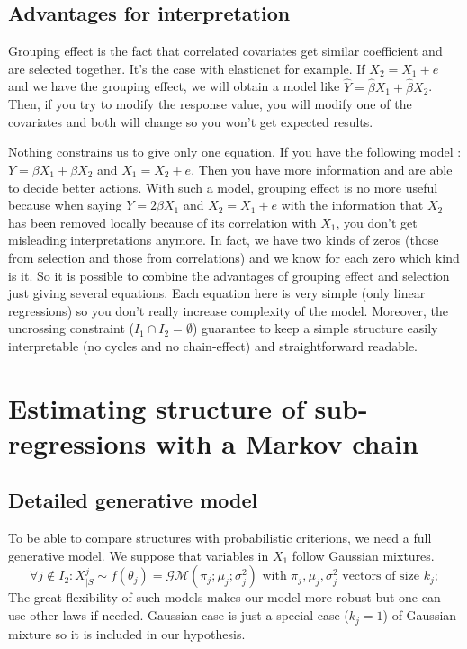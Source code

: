 \documentclass[11pt,a4paper]{article}
\begin{document}
	\subsection{Advantages for interpretation}
	
		Grouping effect is the fact that correlated covariates get similar coefficient and are selected together. It's the case with elasticnet \cite{zou2005regularization} for example.	
			If $X_2=X_1+e$ and we have the grouping effect, we will obtain a model like $\hat{Y}=\hat{\beta}X_1+\hat{\beta}X_2$. 
			Then, if you try to modify the response value, you will modify one of the covariates and both will change so you won't get expected results. 
			
		
		
			Nothing constrains us to give only one equation. %
			If you have the following model : $Y=\beta X_1+\beta X_2$ and $X_1=X_2+e$. Then you have more information and are able to decide better actions. 
			With such a model, grouping effect is no more useful because when saying $Y=2\beta X_1$ and $X_2=X_1+e$ with the information that $X_2$ has been removed locally because of its correlation with $X_1$, you don't get misleading interpretations anymore. In fact, we have two kinds of zeros (those from selection and those from correlations) and we know for each zero which kind is it.
			So it is possible to combine the advantages of grouping effect and selection just giving several equations. 
			Each equation here is very simple (only linear regressions) so you don't really increase complexity of the model. 
			Moreover, the uncrossing constraint ($I_1\cap I_2=\emptyset$) guarantee to keep a simple structure easily interpretable (no cycles and no chain-effect) and straightforward readable.

	
	\section{Estimating structure of sub-regressions with a Markov chain}	
\subsection{Detailed generative model}
	To be able to compare structures with probabilistic criterions, we need a full generative model. We suppose that variables in $X_1$ follow Gaussian mixtures. 
	\begin{equation}
			\forall j \notin I_2 : X^j_{|S} \sim f(\theta_j)=\mathcal{GM}(\pi_j;\mu_j;\sigma^2_j) \textrm{ with } \pi_j,\mu_j,\sigma^2_j \textrm{ vectors of size } k_j; \label{mixtureX1}
		\end{equation}
		The great flexibility \cite{mclachlan2004finite} of such models makes our model more robust but one can use other laws if needed. Gaussian case is just a special case ($k_j=1$) of Gaussian mixture so it is included in our hypothesis.
\end{document}
